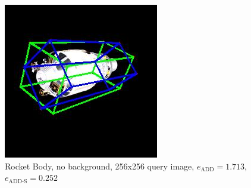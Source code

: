 \begin{figure}[h]
\begin{minipage}{0.45\linewidth}
        \includegraphics[width=\linewidth]{data/fig6.jpg} %
        \caption{Rocket Body, no background, 256x256 query image, $e_\mathrm{ADD}=1.713$, $e_{\mathrm{ADD}\text{-}\mathrm{S}}=0.252$ }
        \label{fig:fig6}
    \end{minipage}
\end{figure}

